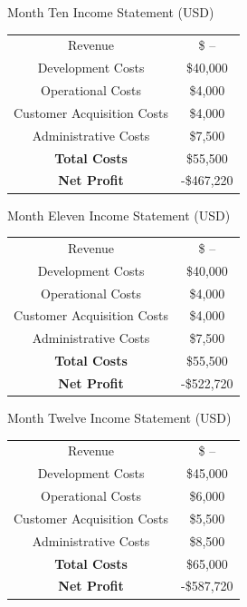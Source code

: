 \documentclass[12pt]{article}
\begin{document}
\vspace{1.5cm}
\begin{center}
	Month Ten Income Statement (USD) \\[1.5ex]
	
	\begin{tabular}{c | c}
	Revenue & \$ -- \\
	Development Costs & \$40,000 \\
	Operational Costs & \$4,000 \\
	Customer Acquisition Costs & \$4,000 \\
	Administrative Costs & \$7,500 \\
	\textbf{Total Costs} & \$55,500 \\
	\textbf{Net Profit} & -\$467,220
	\end{tabular}
\end{center}
\vspace{1.5cm}
\begin{center}
	Month Eleven Income Statement (USD) \\[1.5ex]
	
	\begin{tabular}{c | c}
	Revenue & \$ -- \\
	Development Costs & \$40,000 \\
	Operational Costs & \$4,000 \\
	Customer Acquisition Costs & \$4,000 \\
	Administrative Costs & \$7,500 \\
	\textbf{Total Costs} & \$55,500 \\
	\textbf{Net Profit} & -\$522,720
	\end{tabular}
\end{center}
\vspace{1.5cm}
\begin{center}
	Month Twelve Income Statement (USD) \\[1.5ex]
	
	\begin{tabular}{c | c}
	Revenue & \$ -- \\
	Development Costs & \$45,000 \\
	Operational Costs & \$6,000 \\
	Customer Acquisition Costs & \$5,500 \\
	Administrative Costs & \$8,500 \\
	\textbf{Total Costs} & \$65,000 \\
	\textbf{Net Profit} & -\$587,720
	\end{tabular}
\end{center}
\vspace{1.5cm}
\pagebreak
\end{document}
